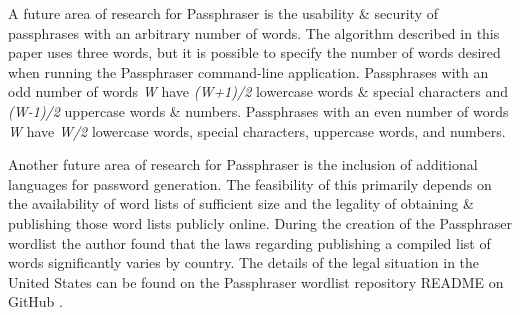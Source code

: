 \documentclass[
	a4paper, %
	10pt, %
	unnumberedsections, %
	twoside, %
]{LTJournalArticle}
\begin{document}
A future area of research for Passphraser is the usability \& security of passphrases with an arbitrary number of words. The algorithm described in this paper uses three words, but it is possible to specify the number of words desired when running the Passphraser command-line application. Passphrases with an odd number of words \textit{W} have \textit{(W+1)/2} lowercase words \& special characters and \textit{(W-1)/2} uppercase words \& numbers. Passphrases with an even number of words \textit{W} have \textit{W/2} lowercase words, special characters, uppercase words, and numbers.

Another future area of research for Passphraser is the inclusion of additional languages for password generation. The feasibility of this primarily depends on the availability of word lists of sufficient size and the legality of obtaining \& publishing those word lists publicly online. During the creation of the Passphraser wordlist the author found that the laws regarding publishing a compiled list of words significantly varies by country. The details of the legal situation in the United States can be found on the Passphraser wordlist repository README on GitHub \autocite{passphraserwordlist}.


\printbibliography %

\end{document}
